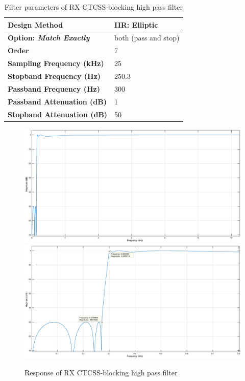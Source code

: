 \begin{table}[h]
  \centering
  \caption{Filter parameters of RX CTCSS-blocking high pass filter}
  \label{tab:ctcss_filt}
  \footnotesize
  \begin{tabular} {|l|l|}
    \hline
    \textbf{Design Method}                  & IIR: Elliptic         \\ \hline
    \textbf{Option: \textit{Match Exactly}} & both (pass and stop)  \\ \hline
    \textbf{Order}                          & 7                     \\ \hline
    \textbf{Sampling Frequency (kHz)}       & 25                    \\ \hline
    \textbf{Stopband Frequency (Hz)}        & 250.3                 \\ \hline
    \textbf{Passband Frequency (Hz)}        & 300                   \\ \hline
    \textbf{Passband Attenuation (dB)}      & 1                     \\ \hline
    \textbf{Stopband Attenuation (dB)}      & 50                    \\ \hline
  \end{tabular}
\end{table}

\begin{figure}[h!]
  \centering
  \includegraphics[width=6.5in]{images/frs/filter/rx/ctcss_hpf_mag.eps} \\
  \includegraphics[width=6.5in]{images/frs/filter/rx/ctcss_hpf_mag_zoomed.eps} \\
  \caption{Response of RX CTCSS-blocking high pass filter}
  \label{fig:ctcss_filt}
\end{figure}

